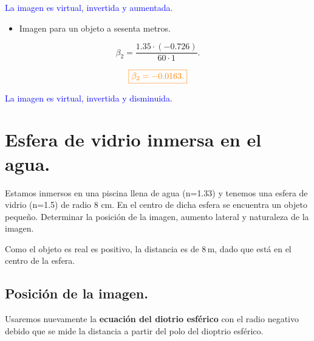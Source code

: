 \documentclass[a4paper,12pt]{article} %
\begin{document}
\begin{justify}
	\centering
	\textcolor{blue}{La imagen es virtual, invertida y aumentada.}	
\end{justify}

\vspace{\baselineskip}

\begin{itemize}
	\item Imagen para un objeto a sesenta metros.
\end{itemize}

\[ \beta_2 = \frac{1.35 \cdot (-0.726)}{60 \cdot 1}. \]

\vspace{\baselineskip}

\[ \textcolor{orange}{\boxed{\beta_2 = -0.0163.}} \]

\vspace{\baselineskip}

\begin{justify}
	\centering
	\textcolor{blue}{La imagen es virtual, invertida y disminuida.}	
\end{justify}

\vspace{\baselineskip}

\section{Esfera de vidrio inmersa en el agua.}

\begin{justify}
	Estamos inmersos en una piscina llena de agua (n=1.33) y tenemos una esfera de vidrio
	(n=1.5) de radio 8 cm. En el centro de dicha esfera se encuentra un objeto pequeño. 
	Determinar la posición de la imagen, aumento lateral y naturaleza de la imagen.
\end{justify}

\begin{justify}
	Como el objeto es real es positivo, la distancia es de \(8 \, \mathrm{m}\), dado que está en el centro de la esfera.
\end{justify}

\vspace{\baselineskip}

\subsection{Posición de la imagen.}

\begin{justify}
	Usaremos nuevamente la \textbf{ecuación del diotrio esférico} con el radio negativo debido que se mide la distancia a partir del polo del dioptrio esférico.
\end{justify}
\end{document}
